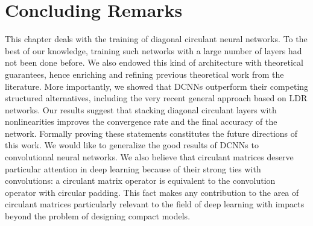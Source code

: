 \section{Concluding Remarks}
\label{section:ch4-concluding_remarks}

This chapter deals with the training of diagonal circulant neural networks.
To the best of our knowledge, training such networks with a large number of layers had not been done before.
We also endowed this kind of architecture with theoretical guarantees, hence enriching and refining previous theoretical work from the literature.
More importantly, we showed that DCNNs outperform their competing structured alternatives, including the very recent general approach based on LDR networks.
Our results suggest that stacking diagonal circulant layers with nonlinearities improves the convergence rate and the final accuracy of the network.
Formally proving these statements constitutes the future directions of this work.
We would like to generalize the good results of DCNNs to convolutional neural networks.
We also believe that circulant matrices deserve particular attention in deep learning because of their strong ties with convolutions: a circulant matrix operator is equivalent to the convolution operator with circular padding.
This fact makes any contribution to the area of circulant matrices particularly relevant to the field of deep learning with impacts beyond the problem of designing compact models.

